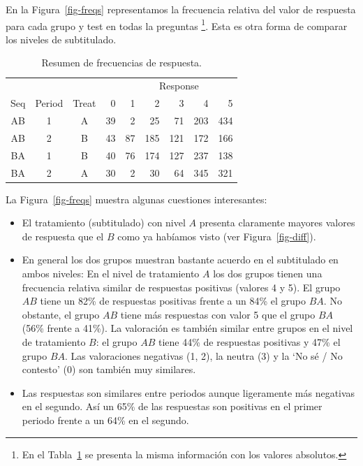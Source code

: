 \documentclass[
  12pt,
  a4paper,
  extrafontsizes,
  onecolumn,
  openright]{memoir}
\begin{document}
En la Figura~\ref{fig-freqs} representamos la frecuencia relativa del
valor de respuesta para cada grupo y test en todas la preguntas
\footnote{En el Tabla~\ref{tbl-resume} se presenta la misma información
  con los valores absolutos.}. Esta es otra forma de comparar los
niveles de subtitulado.

\hypertarget{tbl-resume}{}
\begin{longtable}{cccrrrrrr}
\caption{\label{tbl-resume}Resumen de frecuencias de respuesta. }\tabularnewline

\toprule
 &  &  &  & \multicolumn{5}{c}{Response} \\ 
\cmidrule(lr){5-9}
Seq & Period & Treat & 0 & 1 & 2 & 3 & 4 & 5 \\ 
\midrule
AB & 1 & A & 39 & 2 & 25 & 71 & 203 & 434 \\ 
AB & 2 & B & 43 & 87 & 185 & 121 & 172 & 166 \\ 
BA & 1 & B & 40 & 76 & 174 & 127 & 237 & 138 \\ 
BA & 2 & A & 30 & 2 & 30 & 64 & 345 & 321 \\ 
\bottomrule
\end{longtable}

La Figura~\ref{fig-freqs} muestra algunas cuestiones interesantes:

\begin{itemize}
\item
  El tratamiento (subtitulado) con nivel \(A\) presenta claramente
  mayores valores de respuesta que el \(B\) como ya habíamos visto (ver
  Figura~\ref{fig-diff}).
\item
  En general los dos grupos muestran bastante acuerdo en el subtitulado
  en ambos niveles: En el nivel de tratamiento \(A\) los dos grupos
  tienen una frecuencia relativa similar de respuestas positivas
  (valores 4 y 5). El grupo \(AB\) tiene un 82\% de respuestas positivas
  frente a un 84\% el grupo \(BA\). No obstante, el grupo \(AB\) tiene
  más respuestas con valor 5 que el grupo \(BA\) (56\% frente a 41\%).
  La valoración es también similar entre grupos en el nivel de
  tratamiento \(B\): el grupo \(AB\) tiene 44\% de respuestas positivas
  y 47\% el grupo \(BA\). Las valoraciones negativas (1, 2), la neutra
  (3) y la \enquote*{No sé / No contesto} (0) son también muy similares.
\item
  Las respuestas son similares entre periodos aunque ligeramente más
  negativas en el segundo. Así un 65\% de las respuestas son positivas
  en el primer periodo frente a un 64\% en el segundo.
\end{itemize}
\end{document}
